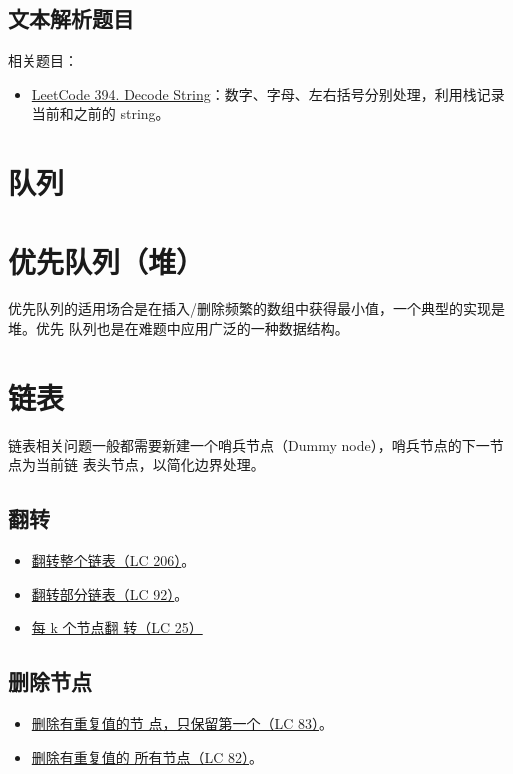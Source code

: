 \subsection{文本解析题目}

相关题目：

\begin{itemize}
  \item
    \href{https://leetcode.com/problems/decode-string/}{LeetCode 394. Decode
      String}：数字、字母、左右括号分别处理，利用栈记录当前和之前的 string。
\end{itemize}

\section{队列}

\section{优先队列（堆）}
优先队列的适用场合是在插入/删除频繁的数组中获得最小值，一个典型的实现是堆。优先
队列也是在难题中应用广泛的一种数据结构。

\section{链表}
链表相关问题一般都需要新建一个哨兵节点（Dummy node），哨兵节点的下一节点为当前链
表头节点，以简化边界处理。

\subsection{翻转}
\begin{itemize}
  \item
    \href{https://leetcode.com/problems/reverse-linked-list}{翻转整个链表（LC
    206）}。
  \item
    \href{https://leetcode.com/problems/reverse-linked-list-ii}{翻转部分链表（LC
    92）}。
  \item
    \href{https://leetcode.com/problems/reverse-nodes-in-k-group/}{每 k 个节点翻
      转（LC 25）}
\end{itemize}

\subsection{删除节点}
\begin{itemize}
  \item
    \href{https://leetcode.com/problems/reverse-linked-list}{删除有重复值的节
      点，只保留第一个（LC 83）}。
  \item
    \href{https://leetcode.com/problems/reverse-linked-list-ii}{删除有重复值的
      所有节点（LC 82）}。
\end{itemize}


